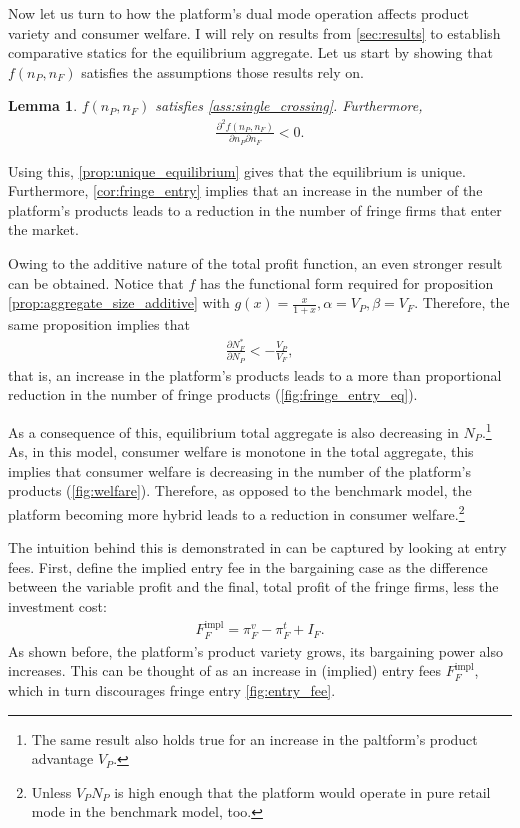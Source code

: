 \documentclass[a4paper]{article}
\newtheorem{lemma}{Lemma}
\begin{document}
Now let us turn to how the platform's dual mode operation affects product variety and consumer welfare.
I will rely on results from \cref{sec:results} to establish comparative statics for the equilibrium aggregate.
Let us start by showing that $f(n_P, n_F)$ satisfies the assumptions those results rely on.
\begin{lemma}
    \label{lem:profit_assumptions}
    $f(n_P, n_F)$ satisfies \cref{ass:single_crossing}.
    Furthermore,
    \begin{align*}
        \frac{\partial^2 f(n_P, n_F)}{\partial n_P \partial n_F} < 0.
    \end{align*}
\end{lemma}
Using this, \cref{prop:unique_equilibrium} gives that the equilibrium is unique.
Furthermore, \cref{cor:fringe_entry} implies that an increase in the number of the platform's products leads to a reduction in the number of fringe firms that enter the market.

Owing to the additive nature of the total profit function, an even stronger result can be obtained.
Notice that $f$ has the functional form required for proposition \ref{prop:aggregate_size_additive} with $g(x) = \frac{x}{1+x}, \alpha = V_P, \beta = V_F$.
Therefore, the same proposition implies that
\begin{align*}
    \frac{\partial N_F^*}{\partial N_P} < -\frac{V_P}{V_F},
\end{align*}
that is, an increase in the platform's products leads to a more than proportional reduction in the number of fringe products (\cref{fig:fringe_entry_eq}).

As a consequence of this, equilibrium total aggregate is also decreasing in $N_P$.\footnote{
    The same result also holds true for an increase in the paltform's product advantage $V_P$.
}
As, in this model, consumer welfare is monotone in the total aggregate, this implies that consumer welfare is decreasing in the number of the platform's products (\cref{fig:welfare}).
Therefore, as opposed to the benchmark model, the platform becoming more hybrid leads to a reduction in consumer welfare.\footnote{
    Unless $V_P N_P$ is high enough that the platform would operate in pure retail mode in the benchmark model, too.
}

The intuition behind this is demonstrated in can be captured by looking at entry fees.
First, define the implied entry fee in the bargaining case as the difference between the variable profit and the final, total profit of the fringe firms, less the investment cost:
\begin{align*}
    F_F^{\text{impl}} = \pi_F^v - \pi_F^t + I_F.
\end{align*}
As shown before, the platform's product variety grows, its bargaining power also increases.
This can be thought of as an increase in (implied) entry fees $F_F^{\text{impl}}$, which in turn discourages fringe entry \cref{fig:entry_fee}.
\end{document}

